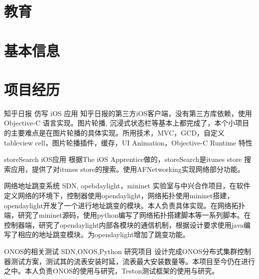 \documentclass[11pt,a4paper]{moderncv}
\title{}               %
\begin{document}
\maketitle

\section{教育}

\section{基本信息}

\section{项目经历}
\renewcommand{\baselinestretch}{1.2}

\vspace*{0.2\baselineskip}
{知乎日报 仿写 iOS 应用}
{}
{}{}
{知乎日报的第三方iOS客户端，没有第三方库依赖，使用 Objective-C 语言实现。图片轮播, 沉浸式状态栏等基本上都完成了，本个小项目的主要难点是在图片轮播的具体实现。所用技术，MVC，GCD，自定义 tableview cell，图片轮播插件，缓存，UI Animation，Objective-C Runtime 特性}

\vspace*{0.2\baselineskip} 
{storeSearch iOS应用}
{}
{}{}
{根据The iOS Apprentice做的，storeSearch是itunes store 搜索应用，提供了对itunes store的搜索。使用AFNetworking实现网络部分功能。}

\vspace*{0.2\baselineskip}
{网络地址跳变系统}
{SDN, opebdaylight，mininet}
{}{}
{实验室与中兴合作项目，在软件定义网络的环境下，控制器使用opendaylight，网络拓扑使用mininet搭建，opendaylight开发了一个进行地址跳变的模块。本人负责具体实现。在网络拓扑端，研究了mininet源码，使用python编写了网络拓扑搭建脚本等一系列脚本。在控制器端，研究了opendaylight内部各模块的通信机制，根据设计要求使用java编写了相应的地址跳变模块。为opendaylight增加了跳变功能。}

\vspace*{0.2\baselineskip}
{ONOS的相关测试}
{SDN,ONOS,Python}
{研究项目}{}
{设计完成ONOS分布式集群控制器测试方案，测试其的流表安装时延，流表最大安装数量等。本项目至今仍在进行之中。本人负责ONOS的使用与研究，Teston测试框架的使用与研究。}
\end{document}
